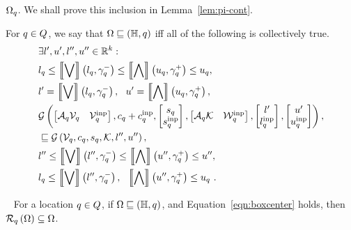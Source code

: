 $\Omega_q$.  We shall prove this inclusion in
Lemma~\ref{lem:pi-cont}.
%
\begin{definition}
  For $q\in Q$, we say that
  $\Omega\sqsubseteq\left(\mathbb{H},q\right)$ iff  all of the following is
  collectively true.
%
\begin{align}
& \exists l^\prime,u^\prime,l^{\prime\prime},u^{\prime\prime}\in\mathbb{R}^k:\nonumber\\
& l_q\leq\left\llbracket\bigvee\right\rrbracket\left(l_q,\gamma_q^-\right)\leq\left\llbracket\bigwedge\right\rrbracket\left(u_q,\gamma_q^+\right)\leq u_{q},~\label{eqn:continv1}\\
& l^\prime= \left\llbracket\bigvee\right\rrbracket\left(l_q,\gamma_q^-\right),~~u^\prime= \left\llbracket\bigwedge\right\rrbracket\left(u_q,\gamma_q^+\right),~\label{eqn:continv2}\\
& \mathcal{G}\left(
\left[\begin{matrix}\mathcal{A}_q\mathcal{V}_q & \mathcal{V}^{\operatorname{inp}}_q\end{matrix}\right]
,
c_q+c^{\operatorname{inp}}_q
,
\left[\begin{matrix}s_q\\ s^{\operatorname{inp}}_q\end{matrix}\right]
,
\left[\begin{matrix}\mathcal{A}_q\mathcal{K} & \mathcal{W}^{\operatorname{inp}}_q\end{matrix}\right]
,
\left[\begin{matrix}l^\prime\\l^{\operatorname{inp}}_q\end{matrix}\right]
,
\left[\begin{matrix}u^\prime\\ u^{\operatorname{inp}}_q\end{matrix}\right]
\right),\nonumber\\
& \sqsubseteq 
\mathcal{G}\left(\mathcal{V}_q,c_q,s_q,\mathcal{K},l^{\prime\prime},u^{\prime\prime}\right),~\label{eqn:continv3}\\
&
l^{\prime\prime}\leq\left\llbracket\bigvee\right\rrbracket\left(l^{\prime\prime},\gamma_q^-\right)\leq\left\llbracket\bigwedge\right\rrbracket\left(u^{\prime\prime},\gamma_q^+\right)\leq u^{\prime\prime},~\label{eqn:continv4}\\
& l_q\leq\left\llbracket\bigvee\right\rrbracket\left(l^{\prime\prime},\gamma_q^-\right),~~\left\llbracket\bigwedge\right\rrbracket\left(u^{\prime\prime},\gamma_q^+\right)\leq u_q~\label{eqn:continv5}.
\end{align}
%
\end{definition}
%
\begin{lemma}~\label{lem:pi-cont}
For a location $q\in Q$, if $\Omega\sqsubseteq\left(\mathbb{H},q\right)$, and
Equation~\ref{eqn:boxcenter} holds, then
$\mathcal{R}_{q}\left(\Omega\right)\subseteq\Omega$.
\end{lemma}
%
